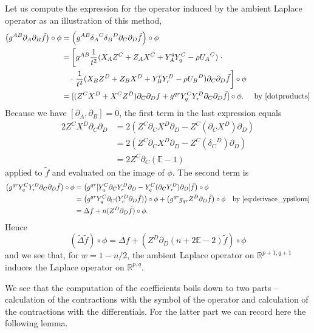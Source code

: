 \documentclass[final]{birkmult}
\theoremstyle{definition}
\theoremstyle{remark}
\numberwithin{equation}{section}
\newcommand{\p}[1]{\partial_{#1}}
\newcommand{\lap}{\Delta}
\newcommand{\alap}{\widetilde{\Delta}}
\newcommand{\R}{\mathbb{R}^{p,q}}
\newcommand{\aR}{\mathbb{R}^{p+1,q+1}}
\newcommand{\bi}[3][c]{X_{#2} Z^{#3} + Z_{#2} X^{#3} + Y_{#2}^{#1} Y^{#3}_{#1}}
\newcommand{\di}[2]{{\delta_{#1}}^{#2}}
\begin{document}
 Let us compute the expression for the operator induced by the ambient Laplace operator as an illustration of this method,
  \begin{align*}
  \left(g^{AB} \p{A}\p{B} \tilde{f}\right)\circ \phi  & =  \left(g^{AB} {\delta_A}^C {\delta_B}^D \p{C} \p{D} \tilde{f}\right)\circ \phi  &\\
		  & =  \left[g^{AB} \frac{1}{t^2}(\bi[q]{A}{C}-\rho {U_A}^C)\right.\cdot&\\ 
		  &\quad \cdot \left.\frac{1}{t^2}(\bi[r]{B}{D}-\rho {U_B}^D) \p{C} \p{D}\tilde{f}\right]\circ \phi &\\
		  &	=  [(Z^C X^D + X^C Z^D) \p{C} \p{D}f + g^{qr} Y_q^C Y_r^D \p{C} \p{D}\tilde{f}]\circ \phi. &\text{by \eqref{dotproducts}}
  \end{align*}
 Because we have $[\p{A},\p{B}]=0$, the first term in the last expression equals
	\begin{align*}
		2Z^CX^D\p{C}\p{D} & = 2\left(Z^C\p{C}X^{D}\p{D}-Z^{C}(\p{C}X^{D})\p{D}\right) \\
				& = 2\left(Z^C\p{C}X^{D}\p{D}-Z^{C}(\di{C}{D})\p{D}\right) \\
				& = 2Z^C\p{C}(\mathbb{E} - 1)
	\end{align*}
  applied to $\tilde{f}$ and evaluated on the image of $\phi$. The second term is
	\begin{align*}
		\big(g^{qr} Y_q^C Y_r^D \p{C} \p{D} \tilde{f}\big)\circ \phi 
			& = \big(g^{qr} [Y_q^C \p{C} Y_r^D  \p{D} - Y_q^C( \p{C} Y_r^D)  \p{D}]\tilde{f}\big)\circ \phi  &\\
			& = \big(g^{qr} Y_q^C \p{C} (Y_r^D\p{D}\tilde{f})\big)\circ \phi  + \big(g^{qr}g_{qr}Z^D\p{D}\tilde{f}\big)\circ \phi & \text{by \eqref{eq:derivace_ypsilonu}}\\
			& = \lap f + n(Z^D\p{D}\tilde{f})\circ \phi.&
	\end{align*}
  Hence 
    \[ (\alap \tilde{f}) \circ \phi = \lap f + \left(Z^D\p{D} (n+2\mathbb{E} - 2)\tilde{f}\right)\circ \phi\]
  and we see that, for $w=1-n/2$, the ambient Laplace operator on $\aR$ induces the Laplace operator on $\R$.

  We see that the computation of the coefficients boils down to two parts -- calculation of the contractions with the symbol of the operator and calculation of the contractions with the differentials. For the latter part we can record here the following lemma.  
\end{document}

